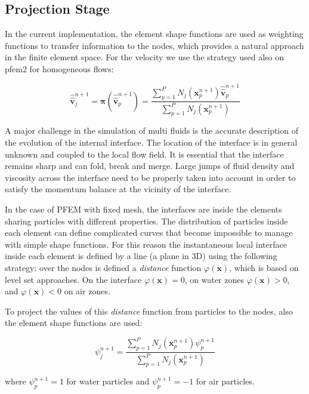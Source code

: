 \documentclass[a4paper,conference]{IEEEtran}
\newcommand{\vv}{\mathbf{v}}
\newcommand{\xx}{\mathbf{x}}
\begin{document}
\subsection{Projection Stage}
      
    In the current implementation, the element shape functions are used as weighting functions to transfer information to the nodes, which provides a natural approach in the finite element space. For the velocity we use the strategy used also on pfem2 for homogeneous flows:
    
    \begin{equation}
      \hat{\hat{\vv}}_j^{n+1} = \boldsymbol{\pi}(\hat{\hat{\vv}}_p^{n+1}) = \dfrac{\sum_{p=1}^P N_j(\xx_p^{n+1}) \hat{\hat{\vv}}_p^{n+1} }{\sum_{p=1}^P N_j(\xx_p^{n+1})}
    \end{equation}

    A major challenge in the simulation of multi fluids is the accurate description of the evolution of the internal interface. The location of the interface is in general unknown and coupled to the local flow field. It is essential that the interface remains sharp and can fold, break and merge. Large jumps of fluid density and viscosity across the interface need to be properly taken into account in order to satisfy the momentum balance at the vicinity of the interface.
    
    In the case of PFEM with fixed mesh, the interfaces are inside the elements sharing particles with different properties. The distribution of particles inside each element can define complicated curves that become impossible to manage with simple shape functions. For this reason the instantaneous local interface inside each element is defined by a line (a plane in 3D) using the following strategy: over the nodes is defined a \textit{distance} function $\varphi(\xx)$, which is based on level set approaches\cite{Osher01}. On the interface $\varphi(\xx)=0$, on water zones $\varphi(\xx)>0$, and $\varphi(\xx)<0$ on air zones. 
    
    To project the values of this \textit{distance} function from particles to the nodes, also the element shape functions are used:
    
    \begin{equation}
      {\psi}_j^{n+1} = \dfrac{\sum_{p=1}^P N_j(\xx_p^{n+1}) {\psi}_p^{n+1} }{\sum_{p=1}^P N_j(\xx_p^{n+1})}
    \end{equation}
    
    where ${\psi}_p^{n+1} = 1$ for water particles and  ${\psi}_p^{n+1} = -1$ for air particles.
    
\end{document}
